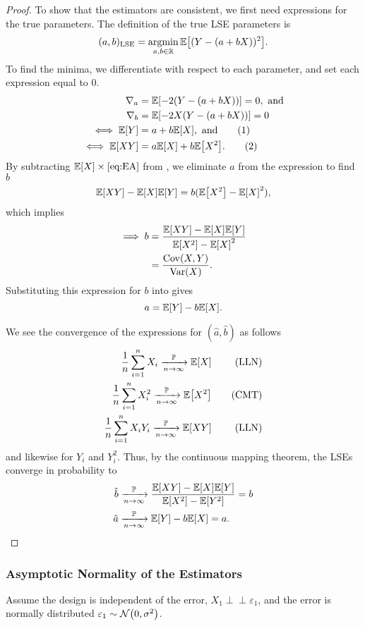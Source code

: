 \documentclass[letterpaper, reqno]{amsart}
\numberwithin{equation}{section}
\newcommand{\numberthis}{\addtocounter{equation}{1}\tag{\theequation}}
\newcommand{\E}[1]{\mathbb{E}\mleft[#1\mright]}
\newcommand{\Var}[1]{\operatorname{Var}\mleft(#1\mright)}
\newcommand{\Cov}[1]{\operatorname{Cov}\mleft(#1\mright)}
\newcommand{\R}{\mathbb{R}}  %
\newcommand{\N}[2]{\mathcal{N}\mleft( #1, #2 \mright)}
\newcommand{\indep}{\perp \!\!\! \perp}  %
\newcommand{\sumi}[2]{\sum_{#1=1}^{#2}}
\newcommand{\avg}[2]{\frac{1}{#2}\sumi{#1}{#2}}
\newcommand{\by}[1]{&\quad&\text{(#1)}}
\newcommand{\Plim}{\xrightarrow[n \to \infty]{\mathbb{P}}}
\newcommand{\ve}{\varepsilon}
\DeclareMathOperator*{\argmin}{argmin}
\begin{document}
\begin{proof}
  To show that the estimators are consistent, we first need expressions for the
  true parameters. The definition of the true LSE parameters is
  \[ (a, b)_\mathrm{LSE} = \argmin_{a, b \in \R} \E{(Y - (a + bX))^2}. \]
  To find the minima, we differentiate with respect to each parameter, and set
  each expression equal to 0.
  \begin{align*}
    \nabla_a &= \E{-2(Y - (a + bX))} = 0, \text{ and} \\
    \nabla_b &= \E{-2X(Y - (a + bX))} = 0 \\
    \iff \E{Y} &= a + b\E{X}, \text{ and} \numberthis \label{eq:EA} \\
    \iff \E{XY} &= a\E{X} + b\E{X^2}. \numberthis \label{eq:EB}
  \end{align*}
  By subtracting $\E{X} \times \text{\Cref{eq:EA}}$ from , we
  eliminate $a$ from the expression to find $b$
  \[ \E{XY} - \E{X}\E{Y} = b(\E{X^2} - \E{X}^2), \]
  which implies
  \begin{align*}
    \implies b &= \frac{\E{XY} - \E{X}\E{Y}}{\E{X^2} - \E{X}^2} \\
               &= \frac{\Cov{X, Y}}{\Var{X}}.
  \end{align*}
  Substituting this expression for $b$ into  gives
  \[ a = \E{Y} - b\E{X}. \]

  We see the convergence of the expressions for $(\hat{a}, \hat{b})$ as follows
  \begin{alignat*}{3}
    \avg{i}{n}{X_i} \Plim \E{X} \by{LLN} \\
    \avg{i}{n}{X_i^2} \Plim \E{X^2} \by{CMT} \\
    \avg{i}{n}{X_iY_i} \Plim \E{XY} \by{LLN}
  \end{alignat*}
  and likewise for $Y_i$ and $Y_i^2$. Thus, by the continuous mapping theorem,
  the LSEs converge in probability to
  \begin{align*}
    \hat{b} &\Plim \frac{\E{XY} - \E{X}\E{Y}}{\E{X^2} - \E{Y^2}} = b \\
    \hat{a} &\Plim \E{Y} - b\E{X} = a. \qedhere
  \end{align*}
\end{proof}

\subsubsection{Asymptotic Normality of the Estimators}
Assume the design is independent of the error, $X_1 \indep \ve_1$, and the error
is normally distributed $\ve_1 \sim \N{0}{\sigma^2}$.
\end{document}
